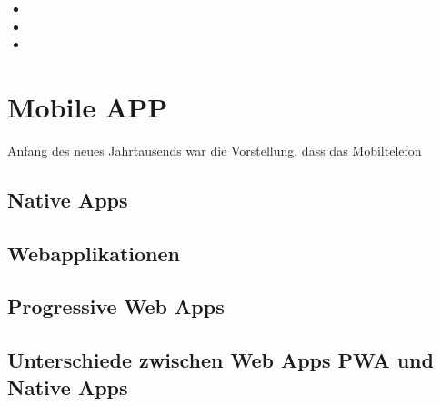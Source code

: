 \begin{itemize}
    \item 
	\item 
	\item 
\end{itemize}



\newpage

\section{Mobile APP}
Anfang des neues Jahrtausends war die Vorstellung, dass das Mobiltelefon  


\subsection{Native Apps}





\subsection{Webapplikationen}


\subsection{Progressive Web Apps}


\subsection{Unterschiede zwischen Web Apps PWA und Native Apps}

\newpage
